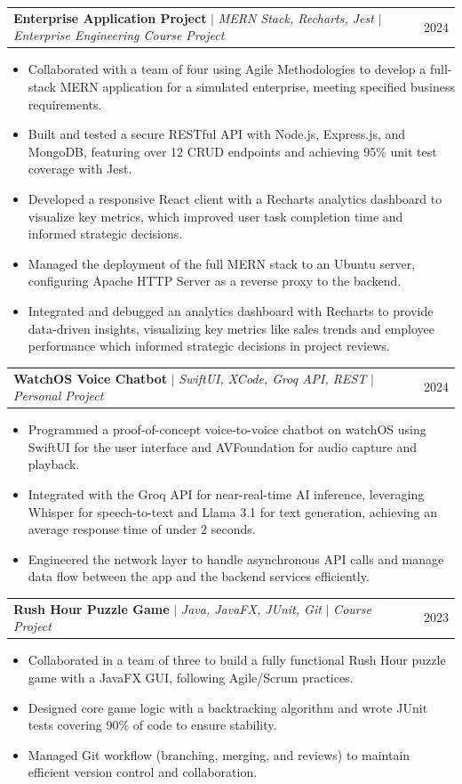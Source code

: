 \documentclass[letterpaper,11pt]{article}
\makeatletter
\newcommand{\resumeItem}[1]{
  \item\small{
    {#1 \vspace{-2pt}}
  }
}
\newcommand{\resumeProjectHeading}[2]{
    \item
    \begin{tabular*}{0.97\textwidth}{l@{\extracolsep{\fill}}r}
      \small#1 & #2 \\
    \end{tabular*}\vspace{-7pt}
}
\newcommand{\resumeItemListStart}{\begin{itemize}}
\newcommand{\resumeItemListEnd}{\end{itemize}\vspace{-5pt}}
\makeatother
\begin{document}
    \resumeProjectHeading
        {\textbf{Enterprise Application Project} $|$ \emph{MERN Stack, Recharts, Jest} $|$ \emph{Enterprise Engineering Course Project}}{2024}
        \resumeItemListStart
          \resumeItem{Collaborated with a team of four using Agile Methodologies to develop a full-stack MERN application for a simulated enterprise, meeting specified business requirements.}
          \resumeItem{Built and tested a secure RESTful API with Node.js, Express.js, and MongoDB, featuring over 12 CRUD endpoints and achieving 95\% unit test coverage with Jest.}
          \resumeItem{Developed a responsive React client with a Recharts analytics dashboard to visualize key metrics, which improved user task completion time and informed strategic decisions.}
          \resumeItem{Managed the deployment of the full MERN stack to an Ubuntu server, configuring Apache HTTP Server as a reverse proxy to the backend.}
          \resumeItem{Integrated and debugged an analytics dashboard with Recharts to provide data-driven insights, visualizing key metrics like sales trends and employee performance which informed strategic decisions in project reviews.}
        \resumeItemListEnd

    \resumeProjectHeading
        {\textbf{WatchOS Voice Chatbot} $|$ \emph{SwiftUI, XCode, Groq API, REST} $|$ \emph{Personal Project}}{2024}
        \resumeItemListStart
            \resumeItem{Programmed a proof-of-concept voice-to-voice chatbot on watchOS using SwiftUI for the user interface and AVFoundation for audio capture and playback.}
            \resumeItem{Integrated with the Groq API for near-real-time AI inference, leveraging Whisper for speech-to-text and Llama 3.1 for text generation, achieving an average response time of under 2 seconds.}
            \resumeItem{Engineered the network layer to handle asynchronous API calls and manage data flow between the app and the backend services efficiently.}
        \resumeItemListEnd

    \resumeProjectHeading
        {\textbf{Rush Hour Puzzle Game} $|$ \emph{Java, JavaFX, JUnit, Git} $|$ \emph{Course Project}}{2023}
        \resumeItemListStart
            \resumeItem{Collaborated in a team of three to build a fully functional Rush Hour puzzle game with a JavaFX GUI, following Agile/Scrum practices.}
            \resumeItem{Designed core game logic with a backtracking algorithm and wrote JUnit tests covering 90\% of code to ensure stability.}
            \resumeItem{Managed Git workflow (branching, merging, and reviews) to maintain efficient version control and collaboration.}
        \resumeItemListEnd
\end{document}
